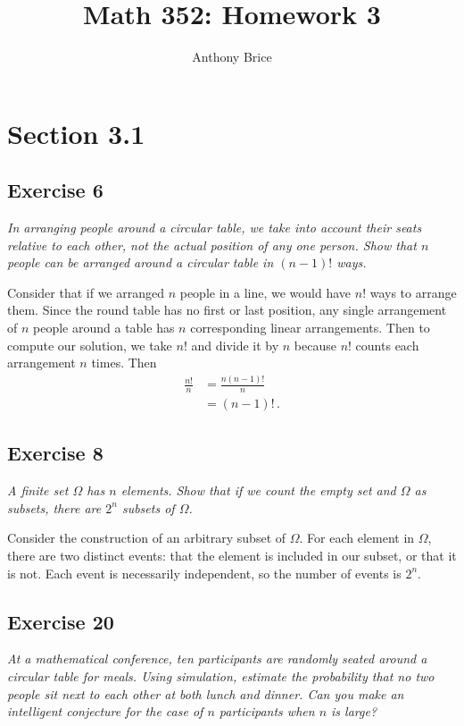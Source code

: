 \documentclass{tufte-handout}
\title{Math 352: Homework 3}
\author{Anthony Brice}
\begin{document}
\maketitle
\section{Section 3.1}
\subsection{Exercise 6}
\begin{description}
\item \emph{In arranging people around a circular table, we take into
    account their seats relative to each other, not the actual
    position of any one person. Show that $n$ people can be arranged
    around a circular table in $(n - 1)!$ ways.}
\end{description}

Consider that if we arranged $n$ people in a line, we would have $n!$
ways to arrange them. Since the round table has no first or last
position, any single arrangement of $n$ people around a table has $n$
corresponding linear arrangements. Then to compute our solution, we
take $n!$ and divide it by $n$ because $n!$ counts each arrangement
$n$ times. Then
\begin{align*}
\frac{n!}{n} &= \frac{n(n-1)!}{n}\\
&= (n-1)! \, .
\end{align*}

\subsection{Exercise 8}
\begin{description}
\item \emph{A finite set $\Omega$ has $n$ elements. Show that if we
    count the empty set and $\Omega$ as subsets, there are $2^n$ subsets
    of $\Omega$.}
\end{description}

Consider the construction of an arbitrary subset of $\Omega$. For each
element in $\Omega$, there are two distinct events: that the element
is included in our subset, or that it is not. Each event is
necessarily independent, so the number of events is $2^n$.

\subsection{Exercise 20}
\begin{description}
\item \emph{At a mathematical conference, ten participants are
    randomly seated around a circular table for meals. Using
    simulation, estimate the probability that no two people sit next
    to each other at both lunch and dinner. Can you make an
    intelligent conjecture for the case of $n$ participants when $n$
    is large?}
\end{description}
\end{document}
